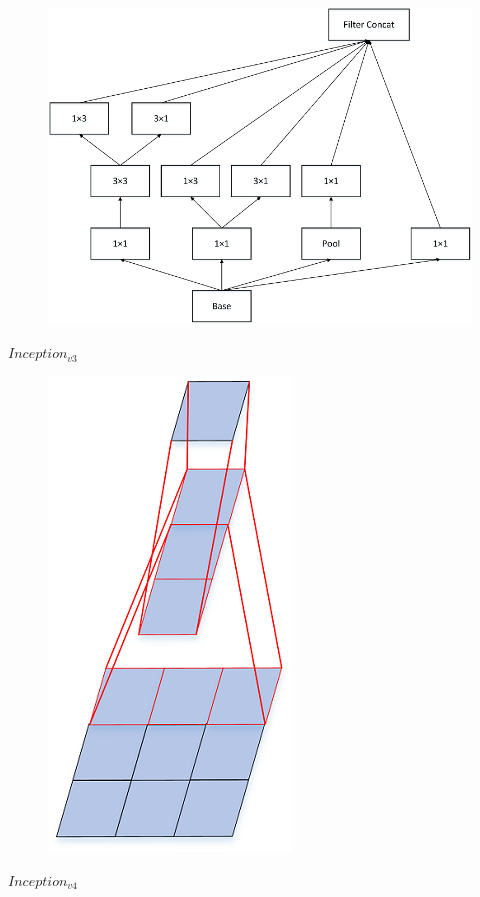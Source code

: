\begin{figure}
\centering
\includegraphics{./img/ch4/image38.png}
\caption{}
\end{figure}

\(Inception_{v3}\)

\begin{figure}
\centering
\includegraphics{./img/ch4/image37.png}
\caption{}
\end{figure}

\(Inception_{v4}\)

